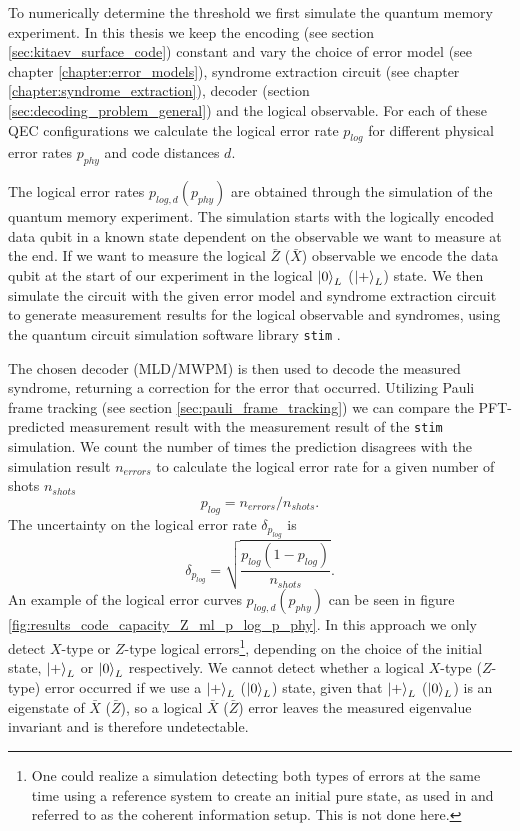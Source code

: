 To numerically determine the threshold we first simulate the quantum memory experiment.
In this thesis we keep the encoding (see section \ref{sec:kitaev_surface_code}) constant 
and vary the choice of error model (see chapter \ref{chapter:error_models}), 
syndrome extraction circuit (see chapter \ref{chapter:syndrome_extraction}),
decoder (section \ref{sec:decoding_problem_general}) and the logical observable.
For each of these QEC configurations we calculate the logical error rate $p_{log}$ for different physical error rates $p_{phy}$ and code distances $d$.

The logical error rates $p_{log,d}(p_{phy})$ are obtained through the simulation of the quantum memory experiment.
The simulation starts with the logically encoded data qubit in a known state dependent on the observable we want to measure at the end.
If we want to measure the logical $\bar{Z}$ ($\bar{X}$) observable we encode the data qubit at the start of our experiment in the logical $\ket{0}_L$  ($\ket{+}_L$) state.
We then simulate the circuit with the given error model and syndrome extraction circuit to generate measurement results for the logical observable and syndromes, 
using the quantum circuit simulation software library \texttt{stim} \cite{stim}.

The chosen decoder (MLD/MWPM) is then used to decode the measured syndrome, returning a correction for the error that occurred.
Utilizing Pauli frame tracking (see section \ref{sec:pauli_frame_tracking}) we can compare the PFT-predicted measurement result with the measurement result of the \texttt{stim} simulation.
We count the number of times the prediction disagrees with the simulation result $n_{errors}$ to calculate the logical error rate for a given number of shots $n_{shots}$ 
\begin{equation}
    p_{log} = n_{errors}/n_{shots}.
\end{equation}
The uncertainty on the logical error rate $\delta_{p_{log}}$ is 
\begin{equation}
    \delta_{p_{log}} = \sqrt{\frac{p_{log}(1-p_{log})}{n_{shots}}}.
\end{equation}
An example of the logical error curves $p_{log,d}(p_{phy})$ can be seen in figure \ref{fig:results_code_capacity_Z_ml_p_log_p_phy}.
In this approach we only detect $X$-type or $Z$-type logical errors\footnote{
    One could realize a simulation detecting both types of errors at the same time using a reference system to create an initial pure state, 
    as used in \cite{quantum_data_processing,fundamental_thresholds} and referred to as the coherent information setup.
    This is not done here.
}, depending on the choice of the initial state, $\ket{+}_L$ or $\ket{0}_L$ respectively.
We cannot detect whether a logical $X$-type ($Z$-type) error occurred if we use a $\ket{+}_L$ ($\ket{0}_L$) state,
given that $\ket{+}_L$ ($\ket{0}_L$) is an eigenstate of $\bar{X}$ ($\bar{Z}$), 
so a logical $\bar{X}$ ($\bar{Z}$) error leaves the measured eigenvalue invariant and is therefore undetectable.

